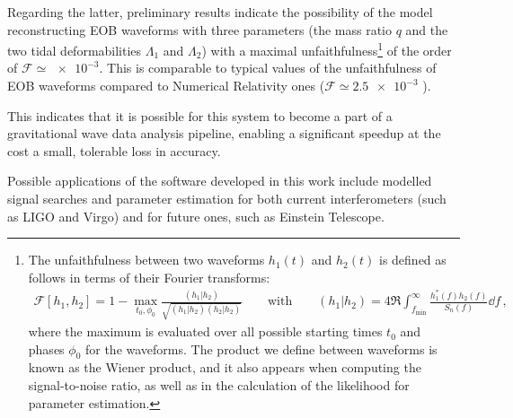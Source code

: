 \documentclass[11pt]{article}
\begin{document}
Regarding the latter, preliminary results indicate the possibility of the model reconstructing EOB waveforms with three parameters (the mass ratio \(q\) and the two tidal deformabilities \(\Lambda_1\) and \(\Lambda_2 \)) with a maximal unfaithfulness\footnote{The unfaithfulness between two waveforms \(h_1 (t)\) and \(h_2(t) \) is defined as follows in terms of their Fourier transforms: 
%
\begin{align}
\mathcal{F} [h_1 , h_2 ] = 1 - \max_{t_0, \phi_0 } \frac{(h_1 | h_2 )}{\sqrt{(h_1 | h_2 ) (h_2 | h_2 )}}
\qquad \text{with} \qquad
(h_1 | h_2 ) = 4 \Re \int_{f _{\text{min}}}^{\infty } \frac{h_1^{*} (f) h_2 (f)}{S_n (f)} \dd{f}
\,,
\end{align}
%
where the maximum is evaluated over all possible starting times \(t_0 \) and phases \(\phi_0 \) for the waveforms. The product we define between waveforms is known as the Wiener product, and it also appears when computing the signal-to-noise ratio, as well as in the calculation of the likelihood for parameter estimation. 
} of the order of \(\mathcal{F} \simeq \num{e-3}\).
This is comparable to typical values of the unfaithfulness of EOB waveforms compared to Numerical Relativity ones (\(\mathcal{F} \simeq \num{2.5e-3}\) \cite[]{nagarTimedomainEffectiveonebodyGravitational2018}).

This indicates that it is possible for this system to become a part of a gravitational wave data analysis pipeline, enabling a significant speedup at the cost a small, tolerable loss in accuracy.

Possible applications of the software developed in this work include modelled signal searches and parameter estimation for both current interferometers (such as LIGO and Virgo) and for future ones, such as Einstein Telescope.


\printbibliography
\end{document}
